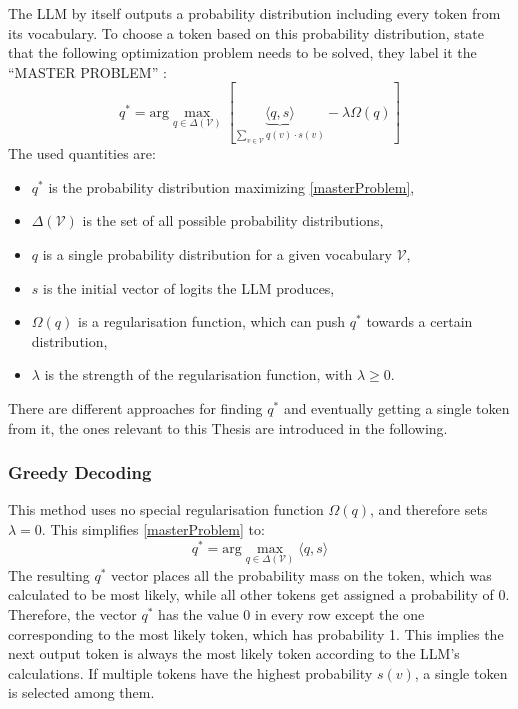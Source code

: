 \documentclass[
	fontsize = 11pt,
	paper = a4,
	draft = false,
	twoside = true,
	titlepage = false
]{scrartcl}
\numberwithin{equation}{subsection}
\begin{document}
	The \gls{LLM} by itself outputs a probability distribution including every \gls{token} from its vocabulary. To choose a \gls{token} based on this probability distribution, \citeauthor{llmDetail} state that the following optimization problem needs to be solved, they label it the \enquote{MASTER PROBLEM} \autocite[p.~5]{llmDetail}:
	\begin{equation}
		q^*= \mathrm{arg}\max_{q \in \Delta(\mathcal{V})} \left[ \underbrace{{\langle q, s \rangle}}_{\sum_{v \in \mathcal{V}} q(v) \cdot s(v)} - \lambda \Omega(q)\right] \label{masterProblem}
	\end{equation}
	The used quantities are:
	\begin{itemize}
		\item $q^*$ is the probability distribution maximizing \autoref{masterProblem},
		\item $\Delta (\mathcal{V})$ is the set of all possible probability distributions,
		\item $q$ is a single probability distribution for a given vocabulary $\mathcal{V}$,
		\item $s$ is the initial vector of \glspl{logit} the \gls{LLM} produces,
		\item $\Omega(q)$ is a regularisation function, which can push $q^*$ towards a certain distribution,
		\item $\lambda$ is the strength of the regularisation function, with $\lambda \geq 0$.
	\end{itemize}
	There are different approaches for finding $q^*$ and eventually getting a single \gls{token} from it, the ones relevant to this Thesis are introduced in the following.
	
	\subsubsection{Greedy Decoding} \label{subsub:greedy}
	This method uses no special regularisation function $\Omega(q)$, and therefore sets $\lambda=0$. This simplifies \autoref{masterProblem} to:
	\begin{equation}
		q^* = \mathrm{arg}\max_{q \in \Delta (\mathcal{V})}\langle q,s\rangle \label{eq:greedyDec}
	\end{equation}
	The resulting $q^*$ vector places all the probability mass on the \gls{token}, which was calculated to be most likely, while all other \glspl{token} get assigned a probability of 0. Therefore, the vector $q^*$ has the value 0 in every row except the one corresponding to the most likely \gls{token}, which has probability 1. This implies the next output \gls{token} is always the most likely \gls{token} according to the \gls{LLM}'s calculations. If multiple \glspl{token} have the highest probability $s(v)$, a single \gls{token} is selected among them. \autocite[p.~10]{llmDetail}
	
\end{document}
